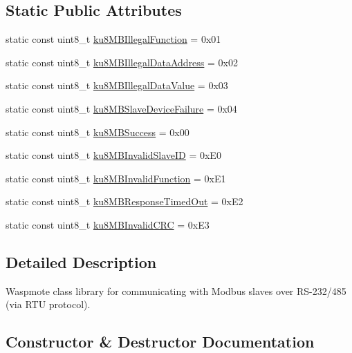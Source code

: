 \subsection*{Static Public Attributes}
\begin{DoxyCompactItemize}
\item 
static const uint8\+\_\+t \hyperlink{class_modbus_master232_a4cce540f90b010767157b4c02ec7b67e}{ku8\+M\+B\+Illegal\+Function} = 0x01
\item 
static const uint8\+\_\+t \hyperlink{class_modbus_master232_a6ded76cb0e4f4a1b300fd18cf82f59da}{ku8\+M\+B\+Illegal\+Data\+Address} = 0x02
\item 
static const uint8\+\_\+t \hyperlink{class_modbus_master232_ab7cc8568ac2defaf240b2e28e7768a95}{ku8\+M\+B\+Illegal\+Data\+Value} = 0x03
\item 
static const uint8\+\_\+t \hyperlink{class_modbus_master232_af9baebfe630c87f0d678110d38999cf2}{ku8\+M\+B\+Slave\+Device\+Failure} = 0x04
\item 
static const uint8\+\_\+t \hyperlink{class_modbus_master232_a6b6f40ff2ea76159dd2073a704588363}{ku8\+M\+B\+Success} = 0x00
\item 
static const uint8\+\_\+t \hyperlink{class_modbus_master232_a1a9b2e570613e0a753465c2c29c77710}{ku8\+M\+B\+Invalid\+Slave\+ID} = 0x\+E0
\item 
static const uint8\+\_\+t \hyperlink{class_modbus_master232_a6783cdbae073f65a8abfad3bc7a164f6}{ku8\+M\+B\+Invalid\+Function} = 0x\+E1
\item 
static const uint8\+\_\+t \hyperlink{class_modbus_master232_a1548431c365a54900c3e6cddae6bfe01}{ku8\+M\+B\+Response\+Timed\+Out} = 0x\+E2
\item 
static const uint8\+\_\+t \hyperlink{class_modbus_master232_aa390e0eb3db73565735fb2857930486f}{ku8\+M\+B\+Invalid\+C\+RC} = 0x\+E3
\end{DoxyCompactItemize}


\subsection{Detailed Description}
Waspmote class library for communicating with Modbus slaves over R\+S-\/232/485 (via R\+TU protocol). 

\subsection{Constructor \& Destructor Documentation}
